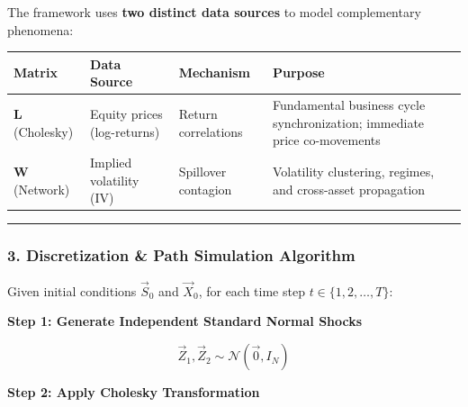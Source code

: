 \documentclass[
]{article}
\newcounter{none} %
\begin{document}
The framework uses \textbf{two distinct data sources} to model
complementary phenomena:

{\def\LTcaptype{none} %
\begin{longtable}[]{@{}
  >{\raggedright\arraybackslash}p{}
  >{\raggedright\arraybackslash}p{}
  >{\raggedright\arraybackslash}p{}
  >{\raggedright\arraybackslash}p{}@{}}
\toprule\noalign{}
\begin{minipage}[b]{\linewidth}\raggedright
Matrix
\end{minipage} & \begin{minipage}[b]{\linewidth}\raggedright
Data Source
\end{minipage} & \begin{minipage}[b]{\linewidth}\raggedright
Mechanism
\end{minipage} & \begin{minipage}[b]{\linewidth}\raggedright
Purpose
\end{minipage} \\
\midrule\noalign{}
\endhead
\bottomrule\noalign{}
\endlastfoot
\textbf{L} (Cholesky) & Equity prices (log-returns) & Return
correlations & Fundamental business cycle synchronization; immediate
price co-movements \\
\textbf{W} (Network) & Implied volatility (IV) & Spillover contagion &
Volatility clustering, regimes, and cross-asset propagation \\
\end{longtable}
}

\begin{center}\rule{0.5\linewidth}{0.5pt}\end{center}

\subsubsection{3. Discretization \& Path Simulation
Algorithm}\label{discretization-path-simulation-algorithm}

Given initial conditions \(\vec{S}_0\) and \(\vec{X}_0\), for each time
step \(t \in \{1, 2, \dots, T\}\):

\textbf{Step 1: Generate Independent Standard Normal Shocks}

\[\vec{Z}_1, \vec{Z}_2 \sim \mathcal{N}(\vec{0}, I_N)\]

\textbf{Step 2: Apply Cholesky Transformation}
\end{document}
